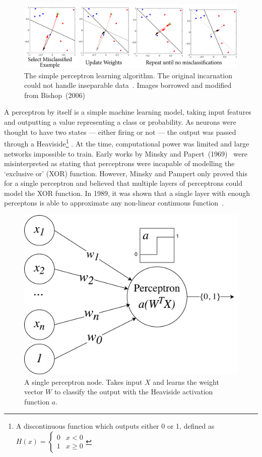 \documentclass[12pt, twoside]{book}
\renewcommand\emph[1]{\textit{\color{USred}{#1}}}
\begin{document}
\begin{figure}[h]
\centering\includegraphics[width=1\linewidth]{perceptron.png}
\caption{The simple perceptron learning algorithm. The original incarnation could not handle inseparable data~\cite{rosenblatt1958perceptron}. Images borrowed and modified from Bishop~(2006)~\cite{prml} }
\label{perceptron}
\end{figure}

A perceptron by itself is a simple machine learning model, taking input features  and outputting a value representing a class or probability. As neurons were thought to have two states --- either firing or not --- the output was passed through a Heaviside\footnote{A discontinuous function which outputs either 0 or 1, defined as $ H(x)=\begin{cases} 
      0 & x < 0 \\
      1 & x \geq 0 
   \end{cases}
$} \emph{activation function}. At the time, computational power was limited and large networks impossible to train. Early works by Minsky and Papert~(1969)~\cite{minsky1969perceptrons} were misinterpreted as stating that perceptrons were incapable of modelling the `exclusive or' (XOR) function. However, Minsky and Pampert only proved this for a single perceptron and believed that multiple layers of perceptrons could model the XOR function. In 1989, it was shown that a single layer with enough perceptons is able to approximate any non-linear continuous function~\cite{nnuniversalapprox}.


\begin{figure}[h]
\centering\includegraphics[width=0.5\linewidth]{perceptron.pdf}
\caption{A single perceptron node. Takes input $X$ and learns the weight vector $W$ to classify the output with the Heaviside activation function $a$.}
\label{perceptronvis}
\end{figure}
\end{document}
